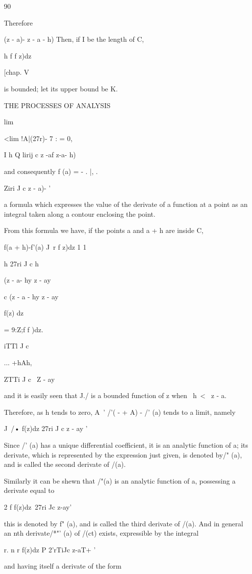 {{90

Therefore

(z - a)- z - a - h) Then, if I be the length of C,

h f f z)dz

[chap. V

is bounded; let its upper bound be K.

THE PROCESSES OF ANALYSIS

lim

<lim !A|(27r)- 7 : = 0,

I h Q lirij c z -af z-a- h)

and consequently f (a) = - . |, .

   Ziri J c z - a)- '

a formula which expresses the value of the derivate of a function at a
point as an integral taken along a contour enclosing the point.

From this formula we have, if the points a and a + h are inside C,

f(a + h)-f'(a) J\ r f z)dz 1 1

h 27ri J c h

(z - a- hy z - ay

c (z - a - hy z - ay

f(z) dz

= 9:Z;f f )dz.

iTTl J c

... +hAh,

ZTTi J c \ Z - ay

and it is easily seen that J./ is a bounded function of z when \ h\ <
\ z - a.

Therefore, as h tends to zero, A~' /'( - + A) - /' (a) tends to a
limit, namely

J\ /• f(z)dz 27ri J c z - ay '

Since /' (a) has a unique differential coefficient, it is an analytic
function of a; its derivate, which is represented by the expression
just given, is denoted by/" (a), and is called the second derivate of
/(a).

Similarly it can be shewn that /"(a) is an analytic function of a,
possessing a derivate equal to

2 f f(z)dz\ 27ri Jc z-ay'

this is denoted by f" (a), and is called the third derivate of /(a).
And in general an nth derivate/*"' (a) of /(ct) exists, expressible by
the integral

r. n r f(z)dz P 2'rTiJc z-aT+ '

and having itself a derivate of the form

}}
